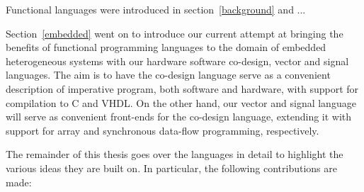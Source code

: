 \documentclass[../paper.tex]{subfiles}
\begin{document}
Functional languages were introduced in section~\ref{background} and ...


Section~\ref{embedded} went on to introduce our current attempt at bringing the benefits of functional programming languages to the domain of embedded heterogeneous systems with our hardware software co-design, vector and signal languages. The aim is to have the co-design language serve as a convenient description of imperative program, both software and hardware, with support for compilation to C and VHDL. On the other hand, our vector and signal language will serve as convenient front-ends for the co-design language, extending it with support for array and synchronous data-flow programming, respectively.

The remainder of this thesis goes over the languages in detail to highlight the various ideas they are built on. In particular, the following contributions are made:
\end{document}

